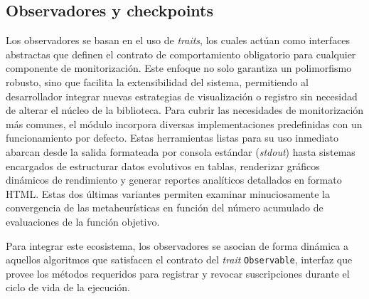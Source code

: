 \documentclass[12pt,a4paper,twoside,openright]{book}
\begin{document}
    \subsection{Observadores y checkpoints}
        Los observadores se basan en el uso de \textit{traits}, los cuales actúan como interfaces abstractas que definen el contrato de comportamiento obligatorio para cualquier componente de monitorización. Este enfoque no solo garantiza un polimorfismo robusto, sino que facilita la extensibilidad del sistema, permitiendo al desarrollador integrar nuevas estrategias de visualización o registro sin necesidad de alterar el núcleo de la biblioteca. Para cubrir las necesidades de monitorización más comunes, el módulo incorpora diversas implementaciones predefinidas con un funcionamiento por defecto. Estas herramientas listas para su uso inmediato abarcan desde la salida formateada por consola estándar (\textit{stdout}) hasta sistemas encargados de estructurar datos evolutivos en tablas, renderizar gráficos dinámicos de rendimiento y generar reportes analíticos detallados en formato HTML. Estas dos últimas variantes permiten examinar minuciosamente la convergencia de las metaheurísticas en función del número acumulado de evaluaciones de la función objetivo.

        Para integrar este ecosistema, los observadores se asocian de forma dinámica a aquellos algoritmos que satisfacen el contrato del \textit{trait} \texttt{Observable}, interfaz que provee los métodos requeridos para registrar y revocar suscripciones durante el ciclo de vida de la ejecución.
\end{document}

